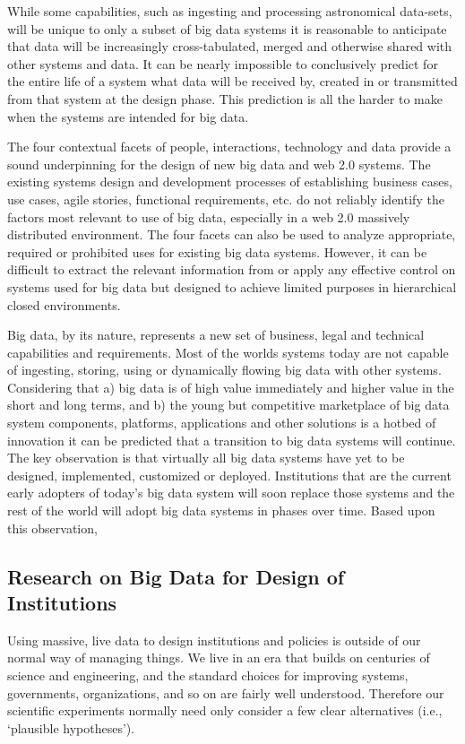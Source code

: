 While some capabilities, such as ingesting and processing astronomical data-sets, will be unique to only a subset of big data systems it is reasonable to anticipate that data will be increasingly cross-tabulated, merged and otherwise shared with other systems and data. It can be nearly impossible to conclusively predict for the entire life of a system what data will be received by, created in or transmitted from that system at the design phase. This prediction is all the harder to make when the systems are intended for big data.

The four contextual facets of people, interactions, technology and data provide a sound underpinning for the design of new big data and web 2.0 systems. The existing systems design and development processes of establishing business cases, use cases, agile stories, functional requirements, etc. do not reliably identify the factors most relevant to use of big data, especially in a web 2.0 massively distributed environment. The four facets can also be used to analyze appropriate, required or prohibited uses for existing big data systems. However, it can be difficult to extract the relevant information from or apply any effective control on systems used for big data but designed to achieve limited purposes in hierarchical closed environments.

Big data, by its nature, represents a new set of business, legal and technical capabilities and requirements. Most of the worlds systems today are not capable of ingesting, storing, using or dynamically flowing big data with other systems. Considering that a) big data is of high value immediately and higher value in the short and long terms, and b) the young but competitive marketplace of big data system components, platforms, applications and other solutions is a hotbed of innovation it can be predicted that a transition to big data systems will continue. The key observation is that virtually all big data systems have yet to be designed, implemented, customized or deployed. Institutions that are the current early adopters of today’s big data system will soon replace those systems and the rest of the world will adopt big data systems in phases over time. Based upon this observation,

\subsection{Research on Big Data for Design of Institutions}

Using massive, live data to design institutions and policies is outside of our normal way of managing things. We live in an era that builds on centuries of science and engineering, and the standard choices for improving systems, governments, organizations, and so on are fairly well understood. Therefore our scientific experiments normally need only consider a few clear alternatives (i.e., ‘plausible hypotheses’).


